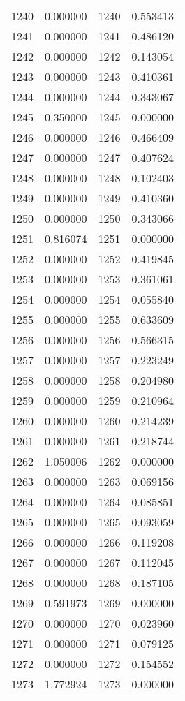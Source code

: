 \documentclass[12pt]{article}
\begin{document}
\begin{longtable}{@{}cccc@{}}
1240 & 0.000000 & 1240 & 0.553413 \\
1241 & 0.000000 & 1241 & 0.486120 \\
1242 & 0.000000 & 1242 & 0.143054 \\
1243 & 0.000000 & 1243 & 0.410361 \\
1244 & 0.000000 & 1244 & 0.343067 \\
1245 & 0.350000 & 1245 & 0.000000 \\
1246 & 0.000000 & 1246 & 0.466409 \\
1247 & 0.000000 & 1247 & 0.407624 \\
1248 & 0.000000 & 1248 & 0.102403 \\
1249 & 0.000000 & 1249 & 0.410360 \\
1250 & 0.000000 & 1250 & 0.343066 \\
1251 & 0.816074 & 1251 & 0.000000 \\
1252 & 0.000000 & 1252 & 0.419845 \\
1253 & 0.000000 & 1253 & 0.361061 \\
1254 & 0.000000 & 1254 & 0.055840 \\
1255 & 0.000000 & 1255 & 0.633609 \\
1256 & 0.000000 & 1256 & 0.566315 \\
1257 & 0.000000 & 1257 & 0.223249 \\
1258 & 0.000000 & 1258 & 0.204980 \\
1259 & 0.000000 & 1259 & 0.210964 \\
1260 & 0.000000 & 1260 & 0.214239 \\
1261 & 0.000000 & 1261 & 0.218744 \\
1262 & 1.050006 & 1262 & 0.000000 \\
1263 & 0.000000 & 1263 & 0.069156 \\
1264 & 0.000000 & 1264 & 0.085851 \\
1265 & 0.000000 & 1265 & 0.093059 \\
1266 & 0.000000 & 1266 & 0.119208 \\
1267 & 0.000000 & 1267 & 0.112045 \\
1268 & 0.000000 & 1268 & 0.187105 \\
1269 & 0.591973 & 1269 & 0.000000 \\
1270 & 0.000000 & 1270 & 0.023960 \\
1271 & 0.000000 & 1271 & 0.079125 \\
1272 & 0.000000 & 1272 & 0.154552 \\
1273 & 1.772924 & 1273 & 0.000000 \\

\end{longtable}
\end{document}
